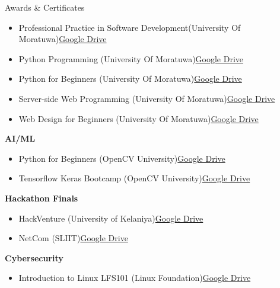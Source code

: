 \documentclass{resume} %
\begin{document}
\begin{rSection}{Awards \& Certificates}
\begin{itemize}
    \item Professional Practice in Software Development(University Of Moratuwa)\hfill \href{https://drive.google.com/file/d/1feCPqYzXEagBv_BZLAQHP2hTA1o4HYFx/view?usp=drive_link}{Google Drive}
    \item Python Programming (University Of Moratuwa)\hfill \href{https://drive.google.com/file/d/1jdatfOeysogIqXMangr2uNSzVPpCAaMc/view?usp=drive_link}{Google Drive}
    \item Python for Beginners (University Of Moratuwa)\hfill \href{https://drive.google.com/file/d/1eQzd4QBW_jva9GsjuKIMt7P2-jryc_i2/view?usp=drive_link}{Google Drive}
    \item Server-side Web Programming  (University Of Moratuwa)\hfill \href{https://drive.google.com/file/d/1jQSdFgdjaGz8VikqQC_PZJAMTzNdRxUQ/view?usp=drive_link}{Google Drive}
    \item Web Design for Beginners (University Of Moratuwa)\hfill \href{https://drive.google.com/file/d/1C-p43970ZnWA6M_eQl9wKuk4cUr9IPQO/view?usp=drive_link}{Google Drive}
\end{itemize}
\item \textbf{AI/ML}
\begin{itemize}
    \itemsep -3pt {}
    \item Python for Beginners (OpenCV University)\hfill \href{https://drive.google.com/file/d/1a40Oje3uu5-H4I14vQUqB16s7C5MkMzf/view?usp=drive_link}{Google Drive}
    \item Tensorflow Keras Bootcamp (OpenCV University)\hfill \href{https://drive.google.com/file/d/1BZ2-2i7MEXLSZ-UhOrI5_V2GaNkptLBS/view?usp=drive_link}{Google Drive}
\end{itemize}
\item \textbf{Hackathon Finals}
\begin{itemize}
    \itemsep -3pt {}
    \item HackVenture (University of Kelaniya)\hfill \href{https://drive.google.com/file/d/1xfn9zoJ_tCpgySY_9MMIvY_-e8BUQ_zc/view?usp=drive_link}{Google Drive}
    \item NetCom (SLIIT)\hfill \href{https://drive.google.com/file/d/17V1xmOSupfHvMp7eLLNSiZk9ER27EXCH/view?usp=drive_link}{Google Drive}
\end{itemize}
\item \textbf{Cybersecurity}
\begin{itemize}
    \itemsep -3pt {}
    \item Introduction to Linux LFS101 (Linux Foundation)\hfill \href{https://drive.google.com/file/d/1-PTSxE20w2AyLmdjl-BgFKJepHrb6GD_/view?usp=drive_link}{Google Drive}

\end{itemize}
\end{rSection}
\end{document}

